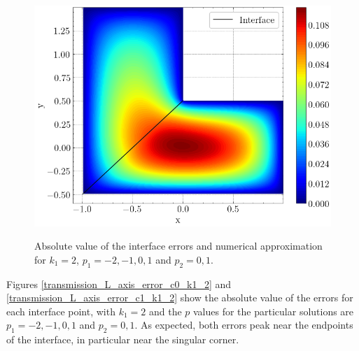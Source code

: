 \begin{figure}[!htb]
    \begin{minipage}{.6\textwidth}
      \centering
      \includegraphics[width=\linewidth]{Images/Transmission/L_shape_2_axis_sol_k1_2_enr.png}
      \label{transmission_L_axis_plot_k1_2}
    \end{minipage}
    
    \caption{Absolute value of the interface errors and numerical approximation for \(k_1=2\), \(p_1=-2, -1, 0, 1\) and \(p_2 = 0, 1\).}
    \label{}
\end{figure}

Figures \ref{transmission_L_axis_error_c0_k1_2} and \ref{transmission_L_axis_error_c1_k1_2} show the absolute value of the errors for each interface point, with \(k_1=2\) and the \(p\) values for the particular solutions are \(p_1=-2, -1, 0, 1\) and \(p_2 = 0, 1\). As expected, both errors peak near the endpoints of the interface, in particular near the singular corner.
